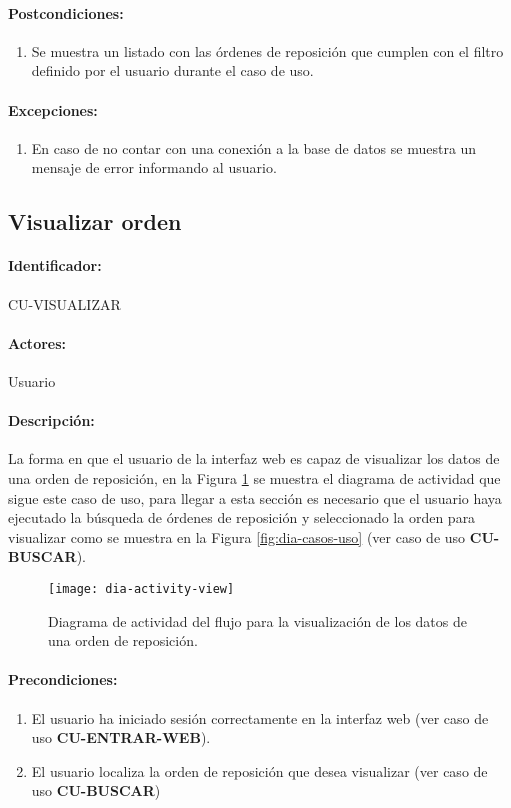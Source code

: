 \paragraph{Postcondiciones:}
\begin{enumerate}
  \item Se muestra un listado con las órdenes de reposición que cumplen con el filtro definido por el usuario durante el caso de uso.
\end{enumerate}
\paragraph{Excepciones:}
\begin{enumerate}
  \item En caso de no contar con una conexión a la base de datos se muestra un mensaje de error informando al usuario.
\end{enumerate}


\subsection{Visualizar orden}\label{cu-visualizar}
\paragraph{Identificador:}
CU-VISUALIZAR
\paragraph{Actores:}
Usuario
\paragraph{Descripción:}
La forma en que el usuario de la interfaz web es capaz de visualizar los datos de una orden de reposición, en la Figura \ref{fig:dia-activity-view} se muestra el diagrama de actividad que sigue este caso de uso, para llegar a esta sección es necesario que el usuario haya ejecutado la búsqueda de órdenes de reposición y seleccionado la orden para visualizar como se muestra en la Figura \ref{fig:dia-casos-uso} (ver caso de uso \textbf{CU-BUSCAR}).
\begin{figure}[h]
  \centering
  \texttt{[image: dia-activity-view]}
  \caption{Diagrama de actividad del flujo para la visualización de los datos de una orden de reposición.}
  \label{fig:dia-activity-view}
\end{figure}
\paragraph{Precondiciones:}
\begin{enumerate}
  \item El usuario ha iniciado sesión correctamente en la interfaz web (ver caso de uso \textbf{CU-ENTRAR-WEB}).
  \item El usuario localiza la orden de reposición que desea visualizar (ver caso de uso \textbf{CU-BUSCAR})
\end{enumerate}
